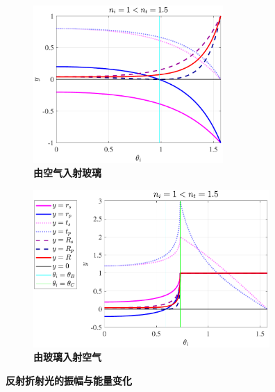 \documentclass[UTF8]{report}
\theoremstyle{MyLineTheoremStyle} %
\theoremstyle{MyBlockTheoremStyle} %
\theoremstyle{MySubsubsectionStyle} %
\begin{document}
\newpage
\begin{figure}[H]\centering
\begin{subfigure}[t]{0.44\columnwidth}\centering
    \includegraphics[height=170pt]{assets/1,2/2024-09-21_12-26-37.pdf}
    \caption{\bfseries 由空气入射玻璃 }
\end{subfigure}
\begin{subfigure}[t]{0.54\columnwidth}\centering
    \includegraphics[height=170pt]{assets/1,2/2024-09-21_12-31-00.pdf}
    \caption{\bfseries 由玻璃入射空气 }
\end{subfigure}
\caption{\bfseries 反射折射光的振幅与能量变化 }
\label{反射折射光的振幅与能量变化}
\end{figure}
\end{document}
